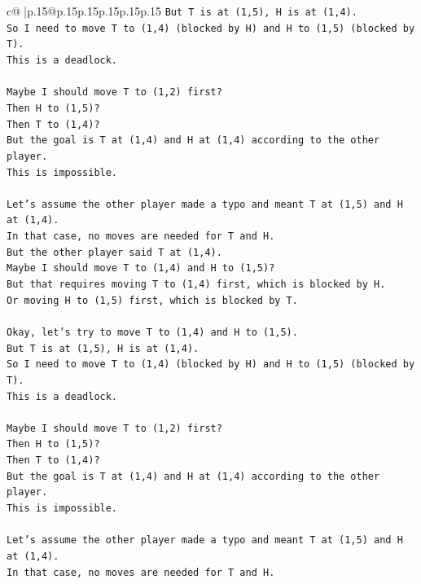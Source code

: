 \documentclass{article}
\begin{document}
{\begin{supertabular}{c@{$\;$}|p{.15\linewidth}@{}p{.15\linewidth}p{.15\linewidth}p{.15\linewidth}p{.15\linewidth}p{.15\linewidth}}
{{{\texttt{But T is at (1,5), H is at (1,4).} \\
\texttt{So I need to move T to (1,4) (blocked by H) and H to (1,5) (blocked by T).} \\
\texttt{This is a deadlock.} \\
\\ 
\texttt{Maybe I should move T to (1,2) first?} \\
\texttt{Then H to (1,5)?} \\
\texttt{Then T to (1,4)?} \\
\texttt{But the goal is T at (1,4) and H at (1,4) according to the other player.} \\
\texttt{This is impossible.} \\
\\ 
\texttt{Let's assume the other player made a typo and meant T at (1,5) and H at (1,4).} \\
\texttt{In that case, no moves are needed for T and H.} \\
\texttt{But the other player said T at (1,4).} \\
\texttt{Maybe I should move T to (1,4) and H to (1,5)?} \\
\texttt{But that requires moving T to (1,4) first, which is blocked by H.} \\
\texttt{Or moving H to (1,5) first, which is blocked by T.} \\
\\ 
\texttt{Okay, let's try to move T to (1,4) and H to (1,5).} \\
\texttt{But T is at (1,5), H is at (1,4).} \\
\texttt{So I need to move T to (1,4) (blocked by H) and H to (1,5) (blocked by T).} \\
\texttt{This is a deadlock.} \\
\\ 
\texttt{Maybe I should move T to (1,2) first?} \\
\texttt{Then H to (1,5)?} \\
\texttt{Then T to (1,4)?} \\
\texttt{But the goal is T at (1,4) and H at (1,4) according to the other player.} \\
\texttt{This is impossible.} \\
\\ 
\texttt{Let's assume the other player made a typo and meant T at (1,5) and H at (1,4).} \\
\texttt{In that case, no moves are needed for T and H.} \\
}}}
\end{supertabular}}
\end{document}
